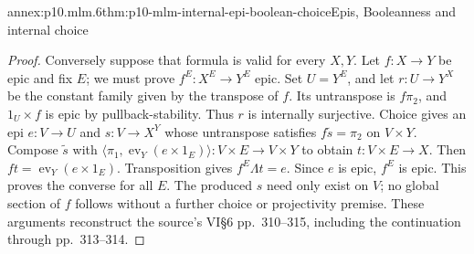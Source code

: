\begin{annexitem}{annex:p10.mlm.6}{thm:p10-mlm-internal-epi-boolean-choice}{Epis, Booleanness and internal choice}
\begin{proof}
Conversely suppose that formula is valid for every \(X,Y\).
Let \(f:X\to Y\) be epic and fix \(E\); we must prove \(f^E:X^E\to Y^E\)
epic. Set \(U=Y^E\), and let \(r:U\to Y^X\) be the constant family given
by the transpose of \(f\). Its untranspose is \(f\pi_2\), and
\(1_U\times f\) is epic by pullback-stability. Thus \(r\) is internally
surjective. Choice gives an epi \(e:V\to U\) and \(s:V\to X^Y\) whose
untranspose satisfies \(f\widetilde s=\pi_2\) on \(V\times Y\).
Compose \(\widetilde s\) with
\(\langle\pi_1,\operatorname{ev}_Y(e\times1_E)\rangle:V\times E\to V\times Y\)
to obtain \(t:V\times E\to X\).
Then \(ft=\operatorname{ev}_Y(e\times1_E)\).
Transposition gives \(f^E\Lambda t=e\). Since \(e\) is epic, \(f^E\) is
epic. This proves the converse for all \(E\). The produced \(s\) need only
exist on \(V\); no global section of \(f\) follows without a further choice
or projectivity premise. These arguments reconstruct the source's
VI\S6 pp.~310--315, including the continuation through pp.~313--314.
\end{proof}
\end{annexitem}

